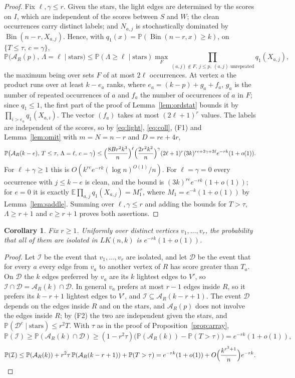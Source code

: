 \documentclass[11pt]{amsart}
\newtheorem{corollary}[theorem]{Corollary}
\theoremstyle{remark}
\numberwithin{equation}{section}
\newcommand{\E}{\mathbb E}
\newcommand{\Pp}{\mathbb P}
\newcommand{\Bin}{\operatorname{Bin}}
\newcommand{\1}{\mathbf 1}
\begin{document}
\begin{proof}
Fix $\ell,\gamma\le r$. Given the stars, the light edges are determined by the scores on $I$, which are independent of the scores between $S$ and $W$; the clean occurrences carry distinct labels; and $N_{a,j}$ is stochastically dominated by $\Bin(n-r,X_{a,j})$. Hence, with $q_1(x)=\Pp(\Bin(n-r,x)\ge k)$, on $\{T\le\tau,\,c=\gamma\}$,
\[
\Pp\bigl(\mathcal A_R(p),\,\Lambda=\ell\mid\text{stars}\bigr)\le\Pp(\Lambda\ge\ell\mid\text{stars})\max_F\prod_{(a,j)\notin F,\ j\le p,\ (a,j)\text{ unrepeated}}q_1(X_{a,j}),
\]
the maximum being over sets $F$ of at most $2\ell$ occurrences. At vertex $a$ the product runs over at least $k-e_a$ ranks, where $e_a=(k-p)+g_a+f_a$, $g_a$ is the number of repeated occurrences of $a$ and $f_a$ the number of occurrences of $a$ in $F$; since $q_1\le1$, the first part of the proof of Lemma~\ref{lem:ordstat} bounds it by $\prod_{i>e_a}q_1(X_{a,i})$. The vector $(f_a)$ takes at most $(2\ell+1)^r$ values. The labels are independent of the scores, so by \eqref{eq:light}, \eqref{eq:coll}, (F1) and Lemma~\ref{lem:omit} with $m=N=n-r$ and $D=re+4r$,
\[
\Pp\bigl(\mathcal A_R(k-e),\,T\le\tau,\,\Lambda=\ell,\,c=\gamma\bigr)\le\Bigl(\frac{8Br^2k^3}n\Bigr)^\ell\Bigl(\frac{2r^2k^2}n\Bigr)^\gamma(2\ell+1)^r(3k)^{re+2\gamma+2\ell}e^{-rk}(1+o(1)).
\]
For $\ell+\gamma\ge1$ this is $O(k^{re}e^{-rk}(\log n)^{O(1)}/n)$. For $\ell=\gamma=0$ every occurrence with $j\le k-e$ is clean, and the bound is $(3k)^{re}e^{-rk}(1+o(1))$; for $e=0$ it is exactly $\E\prod_{a,j}q_1(X_{a,j})=M_1^{\,r}$, where $M_1=e^{-k}(1+o(1))$ by Lemma~\ref{lem:saddle}. Summing over $\ell,\gamma\le r$ and adding the bounds for $T>\tau$, $\Lambda\ge r+1$ and $c\ge r+1$ proves both assertions.
\end{proof}

\begin{corollary}\label{cor:joint}
Fix $r\ge1$. Uniformly over distinct vertices $v_1,\dots,v_r$, the probability that all of them are isolated in $LK(n,k)$ is $e^{-rk}(1+o(1))$.
\end{corollary}

\begin{proof}
Let $\mathcal I$ be the event that $v_1,\dots,v_r$ are isolated, and let $\mathcal D$ be the event that for every $a$ every edge from $v_a$ to another vertex of $R$ has score greater than $T_a$. On $\mathcal D$ the $k$ edges preferred by $v_a$ are its $k$ lightest edges to $V'$, so $\mathcal I\cap\mathcal D=\mathcal A_R(k)\cap\mathcal D$. In general $v_a$ prefers at most $r-1$ edges inside $R$, so it prefers its $k-r+1$ lightest edges to $V'$, and $\mathcal I\subseteq\mathcal A_R(k-r+1)$. The event $\mathcal D$ depends on the edges inside $R$ and on the stars, and $\mathcal A_R(p)$ does not involve the edges inside $R$; by (F2) the two are independent given the stars, and $\Pp(\mathcal D^c\mid\text{stars})\le r^2T$. With $\tau$ as in the proof of Proposition~\ref{prop:array},
\[
\Pp(\mathcal I)\ge\Pp(\mathcal A_R(k)\cap\mathcal D)\ge(1-r^2\tau)\bigl(\Pp(\mathcal A_R(k))-\Pp(T>\tau)\bigr)=e^{-rk}(1+o(1)),
\]
\[
\Pp(\mathcal I)\le\Pp(\mathcal A_R(k))+r^2\tau\,\Pp(\mathcal A_R(k-r+1))+\Pp(T>\tau)=e^{-rk}(1+o(1))+O\Bigl(\frac{k^{r^2+1}}n\Bigr)e^{-rk}.\qedhere
\]
\end{proof}
\end{document}
